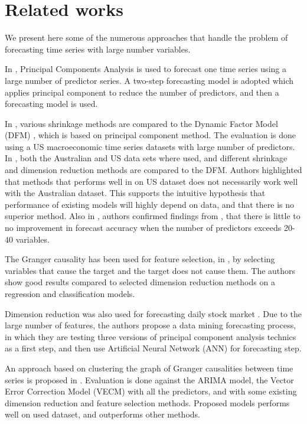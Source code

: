 \documentclass[10pt]{article}
\begin{document}
\section{Related works}
We present here some of the numerous approaches that handle the problem of forecasting time series with large number variables.

In \cite{stock2002forecasting}, Principal Components Analysis is used to forecast one time series using a large number of predictor series. A two-step forecasting model is adopted which applies principal component to reduce the number of predictors, and then a forecasting model is used.

In \cite{stock2012generalized}, various shrinkage methods are compared to the Dynamic Factor Model (DFM) \cite{geweke1977dynamic}, which is based on principal component method. The evaluation is done using a US macroeconomic time series datasets with large number of predictors.
In  \cite{jiang2017macroeconomic}, both the Australian and US data sets where used, and different shrinkage and dimension reduction methods are compared to the DFM. Authors highlighted that methods that performs well in  \cite{stock2012generalized} on US dataset does not necessarily work well with the Australian dataset. This supports the intuitive hypothesis that performance of existing models will highly depend on data, and that there is no superior method. Also in  \cite{jiang2017macroeconomic}, authors confirmed findings from  \cite{stock2012generalized}, that there is little to no improvement in forecast accuracy when the number of predictors exceeds 20-40 variables.

The Granger causality \cite{granger1980testing} has been used for feature selection, in  \cite{sun2015using}, by selecting variables that cause the target and the target does not cause them. The authors show good results compared to selected dimension reduction methods on a regression and classification models.

Dimension reduction was also used for forecasting daily stock market \cite{zhong2017forecasting}. Due to the large number of features, the authors propose a data mining forecasting process, in which they are testing three versions of principal component analysis technics as a first step, and then use Artificial Neural Network (ANN) for forecasting step.

An approach based on clustering the graph of Granger causalities between time series is proposed in  \cite{hmamouche:hal-01467523}. Evaluation is done against the ARIMA model, the Vector Error Correction Model (VECM) with all the predictors, and with some existing dimension reduction and feature selection methods. Proposed models performs well on used dataset, and outperforms other methods.
\end{document}
